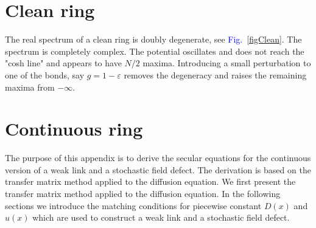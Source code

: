 \documentclass[aps,pre,floats,floatfix,twocolumn]{revtex4}
\newcommand{\Fig}[1]{\textcolor{blue}{Fig.}\!\!~\ref{#1}}
\begin{document}
\section {Clean ring}
\label{A4}

The real spectrum of a clean ring is doubly degenerate, see \Fig{figClean}. The spectrum is completely complex.
The potential oscillates and does not reach the "cosh line" and appears to have $N/2$ maxima. 
Introducing a small perturbation to one of the bonds, say $g=1-\varepsilon$ removes the degeneracy and
raises the remaining maxima from $-\infty$.


\section{Continuous ring}
\label{A5}

The purpose of this appendix is to derive the secular equations for the continuous version of a weak link and a stochastic field defect. 
The derivation is based on the transfer matrix method applied to the diffusion equation. 
We first present the transfer matrix method applied to the diffusion equation.
In the following sections we introduce the matching conditions for piecewise constant $D(x)$ and $u(x)$ which are used to construct a weak link and a stochastic field defect.  
\end{document}

